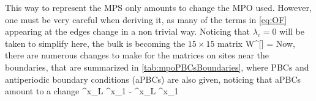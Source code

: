 		This way to represent the MPS only amounts to change the MPO used. However, one must be very careful when deriving it, as many of the terms in \eqref{eq:OF} appearing at the edges change in a non trivial way. Noticing that $\lambda_c=0$ will be taken to simplify here, the bulk is becoming the $15\times15$ matrix
		\be W^{[\ell]} =  \ee
		Now, there are numerous changes to make for the matrices on sites near the boundaries, that are summarized in \autoref{tab:mpoPBCsBoundaries}, where PBCs and antiperiodic boundary conditions (aPBCs) are also given, noticing that aPBCs amount to a change
		\be \sigma^x_L \sigma^x_1 \to - \sigma^x_L \sigma^x_1 \ee


